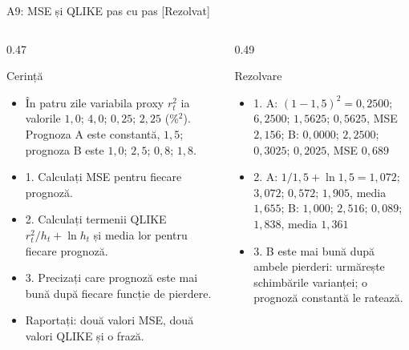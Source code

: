 \begin{frame}{A9: MSE și QLIKE pas cu pas [Rezolvat]}
\itemsize{\scriptsize}
\begin{columns}[T]
\begin{column}{0.47\textwidth}
\begin{block}{Cerință}
\begin{itemize}
    \item În patru zile variabila proxy $r_t^2$ ia valorile $1{,}0$; $4{,}0$; $0{,}25$; $2{,}25$ (\%$^2$). Prognoza A este constantă, $1{,}5$; prognoza B este $1{,}0$; $2{,}5$; $0{,}8$; $1{,}8$.
    \item 1. Calculați MSE pentru fiecare prognoză.
    \item 2. Calculați termenii QLIKE $r_t^2/h_t + \ln h_t$ și media lor pentru fiecare prognoză.
    \item 3. Precizați care prognoză este mai bună după fiecare funcție de pierdere.
    \item Raportați: două valori MSE, două valori QLIKE și o frază.
\end{itemize}
\end{block}
\end{column}
\begin{column}{0.49\textwidth}
\begin{exampleblock}{Rezolvare}
\begin{itemize}
    \item 1. A: $(1 - 1{,}5)^2 = 0{,}2500$; $6{,}2500$; $1{,}5625$; $0{,}5625$, MSE $2{,}156$; B: $0{,}0000$; $2{,}2500$; $0{,}3025$; $0{,}2025$, MSE $0{,}689$
    \item 2. A: $1/1{,}5 + \ln 1{,}5 = 1{,}072$; $3{,}072$; $0{,}572$; $1{,}905$, media $1{,}655$; B: $1{,}000$; $2{,}516$; $0{,}089$; $1{,}838$, media $1{,}361$
    \item 3. B este mai bună după ambele pierderi: urmărește schimbările varianței; o prognoză constantă le ratează.
\end{itemize}
\end{exampleblock}
\end{column}
\end{columns}
\end{frame}

